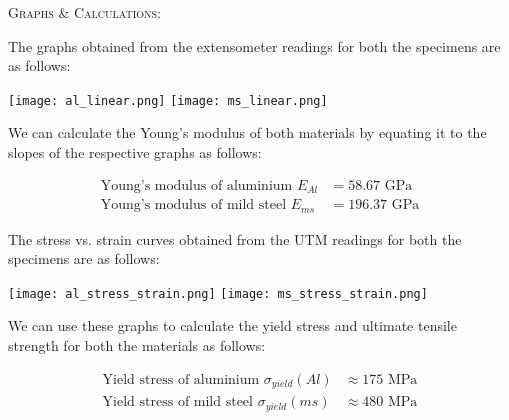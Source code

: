 \documentclass[a4paper, 11pt]{article}
\begin{document}
\textsc{Graphs \& Calculations:}
\vspace{2.5mm}

The graphs obtained from the extensometer readings for both the specimens are as follows:
\vspace{2.5mm}

\texttt{[image: al\_linear.png]}
\hspace{0.05\textwidth}
\texttt{[image: ms\_linear.png]}
\vspace{1.5mm}

We can calculate the Young's modulus of both materials by equating it to the slopes of the respective graphs as follows:
\vspace{-7.5mm}

\begin{align*}
	\text{Young's modulus of aluminium } E_{Al}&=58.67\text{ GPa}\\
	\text{Young's modulus of mild steel } E_{ms}&=196.37\text{ GPa}
\end{align*}

The stress vs. strain curves obtained from the UTM readings for both the specimens are as follows:
\vspace{2.5mm}

\texttt{[image: al\_stress\_strain.png]}
\hspace{0.05\textwidth}
\texttt{[image: ms\_stress\_strain.png]}

We can use these graphs to calculate the yield stress and ultimate tensile strength for both the materials as follows:
\vspace{-7.5mm}

\begin{align*}
	\text{Yield stress of aluminium } \sigma_{yield}(Al)&\approx 175\text{ MPa}\\
	\text{Yield stress of mild steel } \sigma_{yield}(ms)&\approx 480\text{ MPa}
\end{align*}
\vspace{-14mm}
\end{document}

